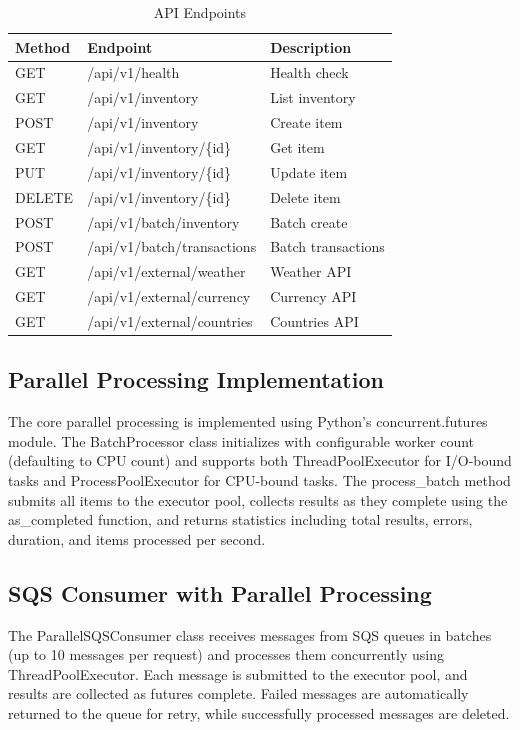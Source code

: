 \documentclass[conference]{IEEEtran}
\begin{document}
\begin{table}[!t]
\caption{API Endpoints}
\centering
\small
\begin{tabular}{p{1.2cm}p{3.5cm}p{2.5cm}}
\toprule
\textbf{Method} & \textbf{Endpoint} & \textbf{Description} \\
\midrule
GET & /api/v1/health & Health check \\
GET & /api/v1/inventory & List inventory \\
POST & /api/v1/inventory & Create item \\
GET & /api/v1/inventory/\{id\} & Get item \\
PUT & /api/v1/inventory/\{id\} & Update item \\
DELETE & /api/v1/inventory/\{id\} & Delete item \\
POST & /api/v1/batch/inventory & Batch create \\
POST & /api/v1/batch/transactions & Batch transactions \\
GET & /api/v1/external/weather & Weather API \\
GET & /api/v1/external/currency & Currency API \\
GET & /api/v1/external/countries & Countries API \\
\bottomrule
\end{tabular}
\end{table}

\subsection{Parallel Processing Implementation}

The core parallel processing is implemented using Python's concurrent.futures module. The BatchProcessor class initializes with configurable worker count (defaulting to CPU count) and supports both ThreadPoolExecutor for I/O-bound tasks and ProcessPoolExecutor for CPU-bound tasks. The process\_batch method submits all items to the executor pool, collects results as they complete using the as\_completed function, and returns statistics including total results, errors, duration, and items processed per second.

\subsection{SQS Consumer with Parallel Processing}

The ParallelSQSConsumer class receives messages from SQS queues in batches (up to 10 messages per request) and processes them concurrently using ThreadPoolExecutor. Each message is submitted to the executor pool, and results are collected as futures complete. Failed messages are automatically returned to the queue for retry, while successfully processed messages are deleted.
\end{document}
